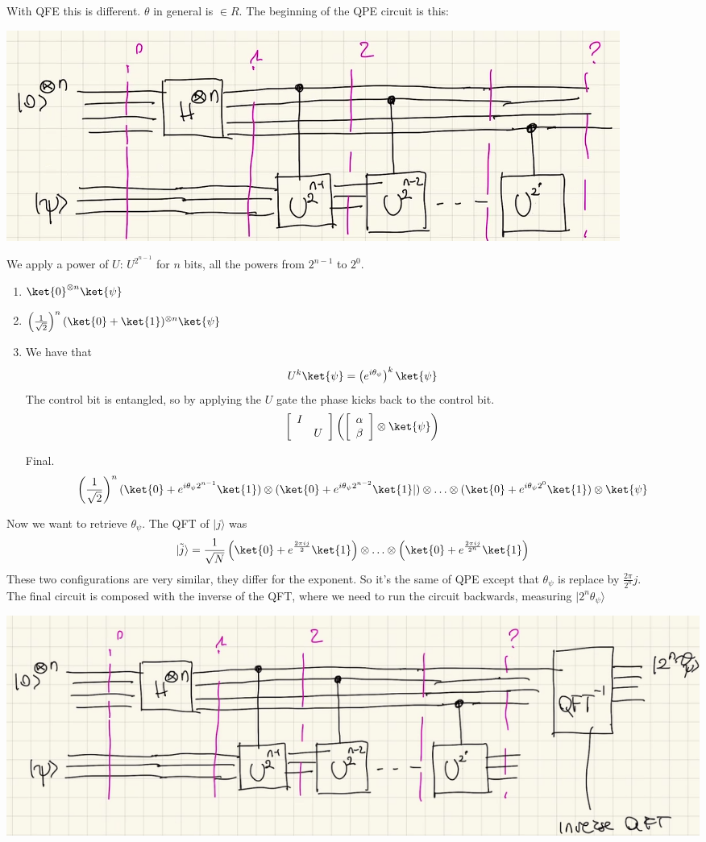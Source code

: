 \documentclass[10pt]{report}
\begin{document}
With QFE this is different. $\theta$ in general is $\in R$. The beginning of the QPE circuit is this:
\begin{center}
	\includegraphics[scale=0.5]{28.png}
\end{center}
We apply a power of $U$: $U^{2^{n-1}}$ for $n$ bits, all the powers from $2^{n-1}$ to $2^0$.
\begin{enumerate}
	\item $\ket{0}^{\otimes n}\ket{\psi}$
	\item $\left(\frac{1}{\sqrt{2}}\right)^n (\ket{0}+\ket{1})^{\otimes n}\ket{\psi}$
	\item We have that $$U^k\ket{\psi} = \left(e^{i\theta_\psi}\right)^k\ket{\psi}$$
	The control bit is entangled, so by applying the $U$ gate the phase kicks back to the control bit.
	$$\left[\begin{array}{c c}
	I&\\
	&U
	\end{array}\right]\left(\left[\begin{array}{c}
	\alpha\\\beta
	\end{array}\right]\otimes\ket{\psi}\right)$$
	\item[Final.] $$\left(\frac{1}{\sqrt{2}}\right)^n (\ket{0}+e^{i\theta_\psi 2^{n-1}}\ket{1})\otimes(\ket{0}+e^{i\theta_\psi 2^{n-2}}\ket{1}|)\otimes\ldots\otimes(\ket{0}+e^{i\theta_\psi 2^{0}}\ket{1})\otimes\ket{\psi}$$
\end{enumerate}
Now we want to retrieve $\theta_\psi$. The QFT of $|j\rangle$ was $$|\tilde{j}\rangle = \frac{1}{\sqrt{N}}\left(\ket{0}+e^{\frac{2\pi ij}{2}}\ket{1}\right)\otimes\ldots\otimes\left(\ket{0}+e^{\frac{2\pi ij}{2^n}}\ket{1}\right)$$
These two configurations are very similar, they differ for the exponent. So it's the same of QPE except that $\theta_\psi$ is replace by $\frac{2\pi}{2^n}j$.\\
The final circuit is composed with the inverse of the QFT, where we need to run the circuit backwards, measuring $|2^n\theta_\psi\rangle$
\begin{center}
	\includegraphics[scale=0.5]{29.png}
\end{center}
\end{document}
